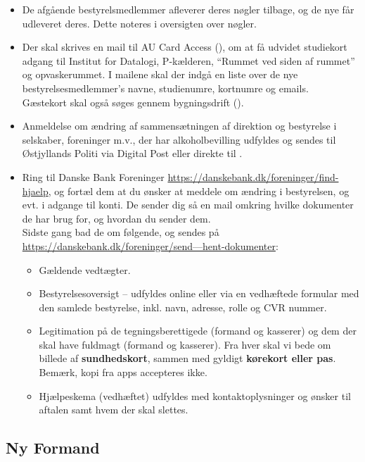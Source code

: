 \begin{itemize}
    \item De afgående bestyrelsmedlemmer afleverer deres nøgler tilbage, og de nye får
    udleveret deres. Dette noteres i oversigten over nøgler.
    \item Der skal skrives en mail til AU Card Access (), om
    at få udvidet studiekort adgang til Institut for Datalogi, P-kælderen, ``Rummet ved 
    siden af rummet'' og opvaskerummet.
    I mailene skal der indgå en liste over de nye bestyrelsesmedlemmer's
    navne, studienumre, kortnumre og emails.\\
    Gæstekort skal også søges gennem bygningsdrift ().
    \item Anmeldelse om ændring af sammensætningen af direktion og bestyrelse i selskaber, foreninger m.v., 
    der har alkoholbevilling udfyldes og sendes til Østjyllands Politi via
    Digital Post eller direkte til .
    \item Ring til Danske Bank Foreninger \url{https://danskebank.dk/foreninger/find-hjaelp}, 
    og fortæl dem at du ønsker at meddele om ændring i bestyrelsen, og evt. i adgange til konti.
    De sender dig så en mail omkring hvilke dokumenter de har brug for, og hvordan du sender dem.\\
    Sidste gang bad de om følgende, og sendes på \href{denne side}{https://danskebank.dk/foreninger/send---hent-dokumenter}:
    \begin{itemize}
        \item Gældende vedtægter.
        \item Bestyrelsesoversigt – udfyldes online eller via en vedhæftede formular med den samlede bestyrelse, 
        inkl. navn, adresse, rolle og CVR nummer. 
        \item Legitimation på de tegningsberettigede (formand og kasserer) og dem der skal have fuldmagt (formand og kasserer). 
        Fra hver skal vi bede om billede af \textbf{sundhedskort}, sammen med gyldigt \textbf{kørekort eller pas}. 
        Bemærk, kopi fra apps accepteres ikke. 
        \item Hjælpeskema (vedhæftet) udfyldes med kontaktoplysninger og ønsker til aftalen samt hvem der skal slettes. 
    \end{itemize}
\end{itemize}

\subsection{Ny Formand}
\label{sec:ny-formand}

